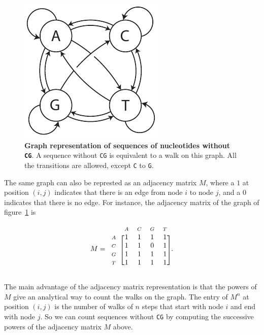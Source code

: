 \documentclass{article}
\newcommand{\smA}{\scriptstyle{A}}
\newcommand{\smC}{\scriptstyle{C}}
\newcommand{\smG}{\scriptstyle{G}}
\newcommand{\smT}{\scriptstyle{T}}
\begin{document}
\begin{figure}[h]
\centering
\includegraphics[scale=0.9]{CG_transitions.pdf}
\caption{\textbf{Graph representation of sequences of nucleotides without
\texttt{CG}}. A sequence without \texttt{CG} is equivalent to a walk on
this graph. All the transitions are allowed, except \texttt{C} to
\texttt{G}.}
\label{fig:CG_transitions}
\end{figure}

The same graph can also be represted as an adjacency matrix $M$, where a
$1$ at position $(i,j)$ indicates that there is an edge from node $i$ to
node $j$, and a $0$ indicates that there is no edge. For instance, the
adjacency matrix of the graph of figure~\ref{fig:CG_transitions} is

\begin{equation*}
M = 
\begin{blockarray}{ccccc}
     & \smA & \smC & \smG & \smT \\
\begin{block}{c[cccc]}
\smA & 1 & 1 & 1 & 1 \\
\smC & 1 & 1 & 0 & 1 \\
\smG & 1 & 1 & 1 & 1 \\
\smT & 1 & 1 & 1 & 1 \\
\end{block}
\end{blockarray}.
\end{equation*}

The main advantage of the adjacency matrix representation is that the
powers of $M$ give an analytical way to count the walks on the graph. The
entry of $M^n$ at position $(i,j)$ is the number of walks of $n$ steps
that start with node $i$ and end with node $j$. So we can count
sequences without \texttt{CG} by computing the successive powers of the
adjacency matrix $M$ above.
\end{document}
